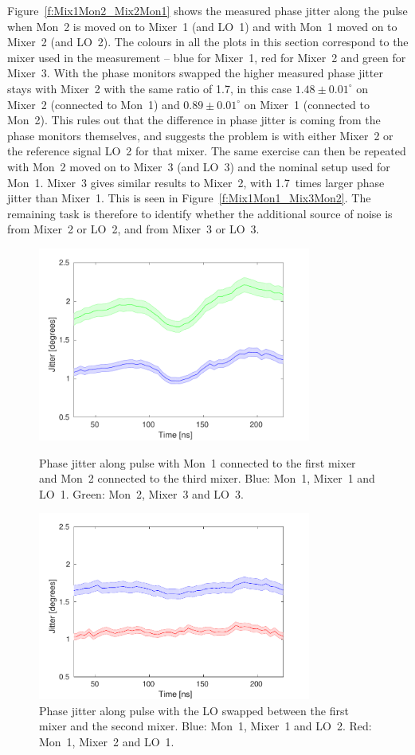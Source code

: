 Figure~\ref{f:Mix1Mon2_Mix2Mon1} shows the measured phase jitter along the pulse when Mon~2 is moved on to Mixer~1 (and LO~1) and with Mon~1 moved on to Mixer~2 (and LO~2). The colours in all the plots in this section correspond to the mixer used in the measurement -- blue for Mixer~1, red for Mixer~2 and green for Mixer~3. With the phase monitors swapped the higher measured phase jitter stays with Mixer~2 with the same ratio of 1.7, in this case \(1.48\pm0.01^\circ\) on Mixer~2 (connected to Mon~1) and \(0.89\pm0.01^\circ\) on Mixer~1 (connected to Mon~2). This rules out that the difference in phase jitter is coming from the phase monitors themselves, and suggests the problem is with either Mixer~2 or the reference signal LO~2 for that mixer. The same exercise can then be repeated with Mon~2 moved on to Mixer~3 (and LO~3) and the nominal setup used for Mon~1. Mixer~3 gives similar results to Mixer~2, with 1.7~times larger phase jitter than Mixer~1. This is seen in Figure~\ref{f:Mix1Mon1_Mix3Mon2}. The remaining task is therefore to identify whether the additional source of noise is from Mixer~2 or LO~2, and from Mixer~3 or LO~3.

\begin{figure}
  \centering
  \includegraphics[width=0.8\textwidth]{Figures/phaseMons/Mix1Mon1_Mix3Mon2}
  \caption{Phase jitter along pulse with Mon~1 connected to the first mixer and Mon~2 connected to the third mixer. Blue: Mon~1, Mixer~1 and LO~1. Green: Mon~2, Mixer~3 and LO~3.}
  \label{f:Mix1Mon1_Mix3Mon2}
  \includegraphics[width=0.8\textwidth]{Figures/phaseMons/Mix1Mon1PhShft2_Mix2Mon2PhShft1}
  \caption{Phase jitter along pulse with the LO swapped between the first mixer and the second mixer. Blue: Mon~1, Mixer~1 and LO~2. Red: Mon~1, Mixer~2 and LO~1.}
  \label{f:Mix1Mon1PhShft2_Mix2Mon2PhShft1}
\end{figure}

